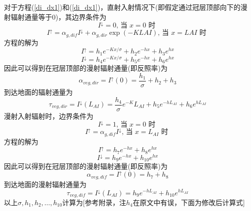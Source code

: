 对于方程(\ref{di_dx1})和(\ref{di_dx1})，直射入射情况下(即假定通过冠层顶部向下的漫射辐射通量等于0)，其边界条件为
\begin{equation}
I^{\downarrow}=0 \text {, 当 } x=0 \text { 时 }
\end{equation}
\begin{equation}
I^{\uparrow}=\alpha_{g, dif} I^{\downarrow}+\alpha_{g, dir} \exp \left(-K LAI \right) \text {, 当 } x=LAI \text { 时 }
\end{equation}
方程的解为
\begin{equation}
I^{\uparrow}=h_{1} e^{-K x / \sigma}+h_{2} e^{-h x}+h_{3} e^{h x}
\end{equation}
\begin{equation}
I^{\downarrow}=h_{4} e^{-K x / \sigma}+h_{5} e^{-h x}+h_{6} e^{h x}
\end{equation}
因此可以得到在冠层顶部的漫射辐射通量(即反照率)为
\begin{equation}
\alpha_{veg, dir}=I^{\uparrow}(0)=\frac{h_{1}}{\sigma}+h_{2}+h_{3}
\end{equation}
到达地面的辐射通量为
\begin{equation}
\tau_{veg, dir}=I^{\downarrow}\left(L_{A I}\right)=\frac{h_{4}}{\sigma} e^{-K} L_{A I}+h_{5} e^{-h L_{A I}}+h_{6} e^{h L_{A I}}
\end{equation}
漫射入射辐射时，边界条件为
\begin{equation}
I^{\downarrow}=1 \text {, 当 } x=0 \text { 时 }
\end{equation}
\begin{equation}
I^{\uparrow}=\alpha_{g, dif} I^{\downarrow} \text {, 当 } x=L_{A I} \text { 时 }
\end{equation}
方程的解为
\begin{equation}
I^{\uparrow}=h_{7} e^{-h x}+h_{8} e^{h x}
\end{equation}
\begin{equation}
I^{\downarrow}=h_{9} e^{-h x}+h_{10} e^{h x}
\end{equation}
因此可以得到在冠层顶部的漫射辐射通量(即反照率)为
\begin{equation}
\alpha_{veg, dif}=I^{\uparrow}(0)=h_{7}+h_{8}
\end{equation}
到达地面的漫射辐射通量为
\begin{equation}
\tau_{veg, dif}=I^{\downarrow}\left(L_{A I}\right)=h_{9} e^{-h L_{A I}}+h_{10} e^{h L_{A I}}
\end{equation}
以上$\sigma,h_1,h_2,\ldots,h_{10}$计算为[参考\citet{sellers1985canopy}附录，注$h_4$在原文中有误，下面为修改后计算式]
